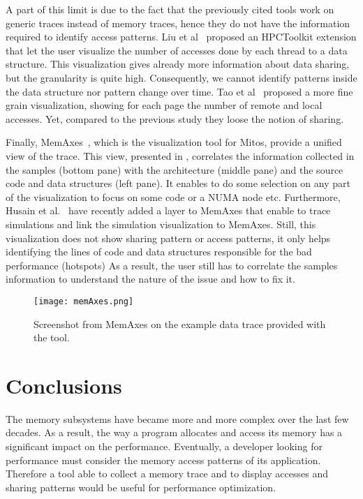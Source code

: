 A part of this limit is due to the fact that the previously cited tools work on generic traces instead of memory traces, hence they do not have the information required to identify access patterns.
Liu et al~\cite{Liu13Datacentric,Liu14Tool} proposed an \gls{HPCToolkit} extension that let the user visualize the number of accesses done by each thread to a data structure.
This visualization gives already more information about data sharing, but the granularity is quite high.
Consequently, we cannot identify patterns inside the data structure nor pattern change over time.
Tao et al~\cite{Tao01Visualizing} proposed a more fine grain  visualization, showing for each page the number of remote and local accesses.
Yet, compared to the previous study they loose the notion of sharing.

Finally, \gls{MemAxes}~\cite{Gimenez14Dissecting}, which is the visualization tool for \gls{Mitos}, provide a unified view of the trace.
This view, presented in , correlates the information collected in the samples (bottom pane) with the architecture (middle pane) and the source code and data structures (left pane).
It enables to do some selection on any part of the visualization to focus on some code or a NUMA node etc.
Furthermore, Husain et al.~\cite{Husain15Relating} have recently added a layer to \gls{MemAxes} that enable to trace simulations and link the simulation visualization to \gls{MemAxes}.
Still, this visualization does not show sharing pattern or access patterns, it only helps identifying the lines of code and data structures responsible for the bad performance (hotspots)
As a result, the user still has to correlate the samples information to understand the nature of the issue and how to fix it.

\begin{figure}[htb]
    \centering
    \texttt{[image: memAxes.png]}
    \caption[Screenshot from MemAxes.]{Screenshot from MemAxes on the example data trace provided with the
    tool.}
    \label{fig:memaxes}
\end{figure}

\section{Conclusions}
\label{sec:mem-cncl}

The memory subsystems have became more and more complex over the last few decades.
As a result, the way a program allocates and access its memory has a significant impact on the performance.
Eventually, a developer looking for performance must consider the memory access patterns of its application.
Therefore a tool able to collect a memory trace and to display accesses and sharing patterns would be useful for performance optimization.

